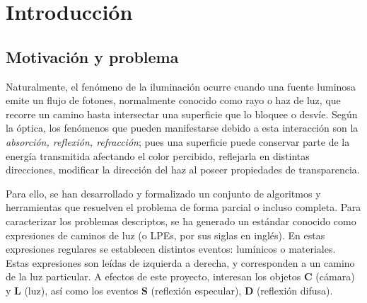 \chapter{Introducción}
\label{ch:chap01}




\section{Motivación y problema}
\label{sec:motivacionYProblemas}

Naturalmente, el fenómeno de la iluminación ocurre cuando una fuente luminosa emite un flujo de fotones, normalmente conocido como rayo o haz de luz, que recorre un camino hasta intersectar una superficie que lo bloquee o desvíe. Según la óptica, los fenómenos que pueden manifestarse debido a esta interacción son la \textit{absorción, reflexión, refracción}; pues una superficie puede conservar parte de la energía transmitida afectando el color percibido, reflejarla en distintas direcciones, modificar la dirección del haz al poseer propiedades de transparencia.

Para ello, se han desarrollado y formalizado un conjunto de algoritmos y herramientas que resuelven el problema de forma parcial o incluso completa. Para caracterizar los problemas descriptos, se ha generado un estándar conocido como expresiones de caminos de luz \cite{LPE} (o LPEs, por sus siglas en inglés). En estas expresiones regulares se establecen distintos eventos: lumínicos o materiales. Estas expresiones son leídas de izquierda a derecha, y corresponden a un camino de la luz particular. A efectos de este proyecto, interesan los objetos \textbf{C} (cámara) y \textbf{L} (luz), así como los eventos \textbf{S} (reflexión especular),  \textbf{D} (reflexión difusa).

